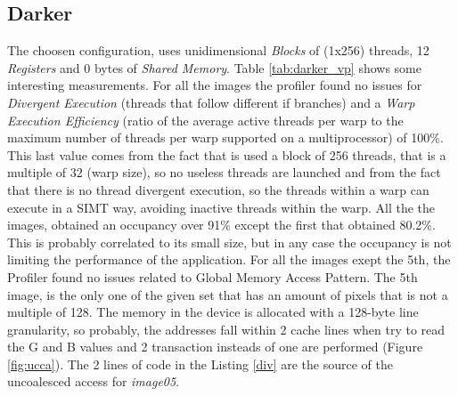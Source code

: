 \documentclass[a4paper]{article}
\begin{document}
\subsection{Darker}
\label{sec:a1}
 The choosen configuration, uses unidimensional \textit{Blocks} of (1x256) threads, 12 \textit{Registers} and 0 bytes of \textit{Shared Memory}. Table \ref{tab:darker_vp} shows some interesting measurements.
 For all the images the profiler found no issues for \textit{Divergent Execution} (threads that follow different if branches) and a \textit{Warp Execution Efficiency} (ratio of the average active threads per warp to the maximum number of threads per warp supported on a multiprocessor) of 100\%. This last value comes from the fact that is used a block of 256 threads, that is a multiple of 32 (warp size), so no useless threads are launched and from the fact that there is no thread divergent execution, so the threads within a warp can execute in a SIMT way, avoiding inactive threads within the warp. All the the images, obtained an occupancy over 91\% except the first that obtained 80.2\%. This is probably correlated to its small size, but in any case the occupancy is not limiting the performance of the application. For all the images exept the 5th, the Profiler found no issues related to Global Memory Access Pattern. The 5th image, is the only one of the given set that has an amount of pixels that is not a multiple of 128. The memory in the device is allocated with a 128-byte line granularity, so probably, the addresses fall within 2 cache lines when try to read the G and B values and 2 transaction insteads of one are performed (Figure \ref{fig:ucca}). The 2 lines of code in the Listing \ref{div} are the source of the uncoalesced access for \textit{image05}. 
 
\end{document}
